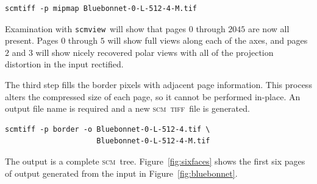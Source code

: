 \documentclass[oneside,10pt]{memoir}
\newcommand{\scm}     {\textsc{scm}}
\newcommand{\tiff}    {\textsc{tiff}}
\newcommand{\scmview} {\texttt{scmview}}
\begin{document}
\begin{Spacing}{1.1}
\begin{Verbatim}
scmtiff -p mipmap Bluebonnet-0-L-512-4-M.tif
\end{Verbatim}

Examination with \scmview\ will show that pages $0$ through $2045$ are now all present. Pages $0$ through $5$ will show full views along each of the axes, and pages $2$ and $3$ will show nicely recovered polar views with all of the projection distortion in the input rectified.

The third step fills the border pixels with adjacent page information. This process alters the compressed size of each page, so it cannot be performed in-place. An output file name is required and a new \scm\ \tiff\ file is generated.

\begin{Verbatim}
scmtiff -p border -o Bluebonnet-0-L-512-4.tif \
                     Bluebonnet-0-L-512-4-M.tif
\end{Verbatim}

The output is a complete \scm\ tree. Figure~\ref{fig:sixfaces} shows the first six pages of output generated from the input in Figure~\ref{fig:bluebonnet}.


\end{Spacing}
\end{document}
